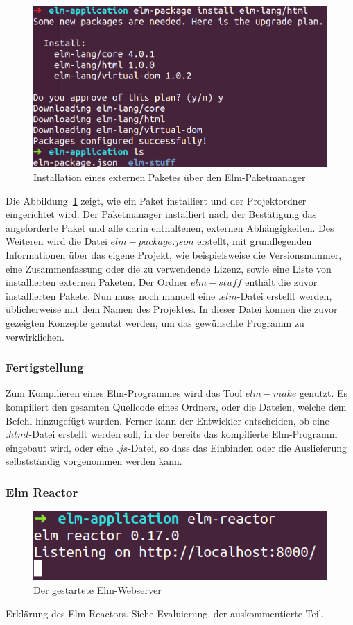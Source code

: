 \begin{figure}[h]
\centering
\includegraphics[scale=0.3]{img/elm-setup.png}
\caption{Installation eines externen Paketes über den Elm-Paketmanager}\label{fig:elm-install-package}
\end{figure}
Die Abbildung~\ref{fig:elm-install-package} zeigt, wie ein Paket installiert und der Projektordner eingerichtet wird. Der Paketmanager installiert nach der Bestätigung das angeforderte Paket und alle darin enthaltenen, externen Abhängigkeiten. Des Weiteren wird die Datei $elm-package.json$ erstellt, mit grundlegenden Informationen über das eigene Projekt, wie beispielsweise die Versionsnummer, eine Zusammenfassung oder die zu verwendende Lizenz, sowie eine Liste von installierten externen Paketen. Der Ordner $elm-stuff$ enthält die zuvor installierten Pakete. Nun muss noch manuell eine $.elm$-Datei erstellt werden, üblicherweise mit dem Namen des Projektes. In dieser Datei können die zuvor gezeigten Konzepte genutzt werden, um das gewünschte Programm zu verwirklichen.


\subsubsection{Fertigstellung}
\label{sec:elm-compile}
Zum Kompilieren eines Elm-Programmes wird das Tool $elm-make$ genutzt. Es kompiliert den gesamten Quellcode eines Ordners, oder die Dateien, welche dem Befehl hinzugefügt wurden. Ferner kann der Entwickler entscheiden, ob eine $.html$-Datei erstellt werden soll, in der bereits das kompilierte Elm-Programm eingebaut wird, oder eine $.js$-Datei, so dass das Einbinden oder die Auslieferung selbstständig vorgenommen werden kann.

\subsubsection{Elm Reactor}
\label{sec:elm-reactor}
\begin{figure}[h]
\centering
\includegraphics[scale=0.5]{img/elm-reactor.png}
\caption{Der gestartete Elm-Webserver}\label{fig:elm-reactor}
\end{figure}
Erklärung des Elm-Reactors. Siehe Evaluierung, der auskommentierte Teil.

